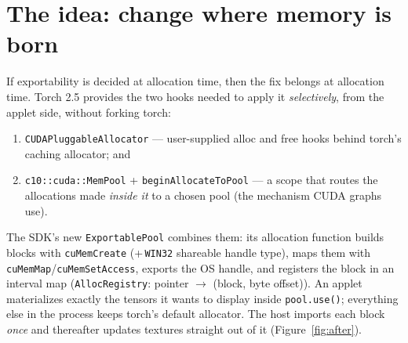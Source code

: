 \documentclass[11pt]{article}
\begin{document}
\section{The idea: change where memory is born}

If exportability is decided at allocation time, then the fix belongs at
allocation time. Torch 2.5 provides the two hooks needed to apply it
\emph{selectively}, from the applet side, without forking torch:

\begin{enumerate}
  \item \texttt{CUDAPluggableAllocator} --- user-supplied alloc and free
        hooks behind torch's caching allocator; and
  \item \texttt{c10::cuda::MemPool} + \texttt{beginAllocateToPool} --- a
        scope that routes the allocations made \emph{inside it} to a chosen
        pool (the mechanism CUDA graphs use).
\end{enumerate}

\noindent
The SDK's new \texttt{ExportablePool} combines them: its allocation function
builds blocks with \texttt{cuMemCreate} (+\,\texttt{WIN32} shareable handle
type), maps them with \texttt{cuMemMap}/\texttt{cuMemSetAccess}, exports the
OS handle, and registers the block in an interval map
(\texttt{AllocRegistry}: pointer $\rightarrow$ (block, byte offset)). An
applet materializes exactly the tensors it wants to display inside
\texttt{pool.use()}; everything else in the process keeps torch's default
allocator. The host imports each block \emph{once} and thereafter updates
textures straight out of it (Figure~\ref{fig:after}).
\end{document}
